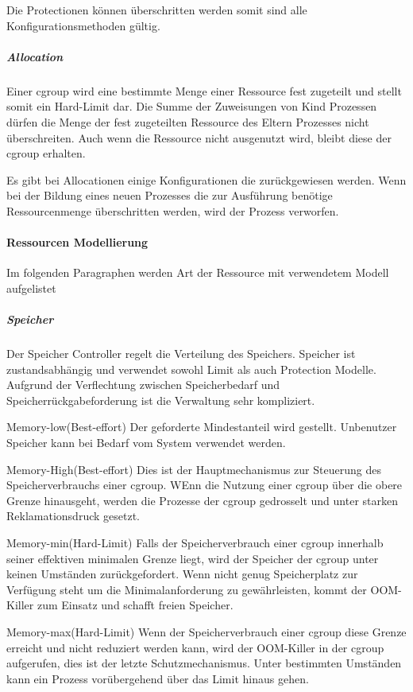 Die Protectionen können überschritten werden somit sind alle Konfigurationsmethoden gültig.

\subparagraph{Allocation}
Einer cgroup wird eine bestimmte Menge einer Ressource fest zugeteilt und stellt somit ein Hard-Limit dar. Die Summe der Zuweisungen von Kind Prozessen dürfen die Menge der fest zugeteilten Ressource des Eltern Prozesses nicht überschreiten. Auch wenn die Ressource nicht ausgenutzt wird, bleibt diese der cgroup erhalten. 

Es gibt bei Allocationen einige Konfigurationen die zurückgewiesen werden. Wenn bei der Bildung eines neuen Prozesses die zur Ausführung benötige Ressourcenmenge überschritten werden, wird der Prozess verworfen.

\paragraph{Ressourcen Modellierung}
Im folgenden Paragraphen werden Art der Ressource mit verwendetem Modell aufgelistet

\subparagraph{Speicher}
Der Speicher Controller regelt die Verteilung des Speichers. Speicher ist zustandsabhängig und verwendet sowohl Limit als auch Protection Modelle. Aufgrund der Verflechtung zwischen Speicherbedarf und Speicherrückgabeforderung ist die Verwaltung sehr kompliziert.

Memory-low(Best-effort)
Der geforderte Mindestanteil wird gestellt. Unbenutzer Speicher kann bei Bedarf vom System verwendet werden.

Memory-High(Best-effort)
Dies ist der Hauptmechanismus zur Steuerung des Speicherverbrauchs einer cgroup. WEnn die Nutzung einer cgroup über die obere Grenze hinausgeht, werden die Prozesse der cgroup gedrosselt und unter starken Reklamationsdruck gesetzt.

Memory-min(Hard-Limit)
Falls der Speicherverbrauch einer cgroup innerhalb seiner effektiven minimalen Grenze liegt, wird der Speicher der cgroup unter keinen Umständen zurückgefordert. Wenn nicht genug Speicherplatz zur Verfügung steht um die Minimalanforderung zu gewährleisten, kommt der OOM-Killer zum Einsatz und schafft freien Speicher.

Memory-max(Hard-Limit)
Wenn der Speicherverbrauch einer cgroup diese Grenze erreicht und nicht reduziert werden kann, wird der OOM-Killer in der cgroup aufgerufen, dies ist der letzte Schutzmechanismus. Unter bestimmten Umständen kann ein Prozess vorübergehend über das Limit hinaus gehen.

